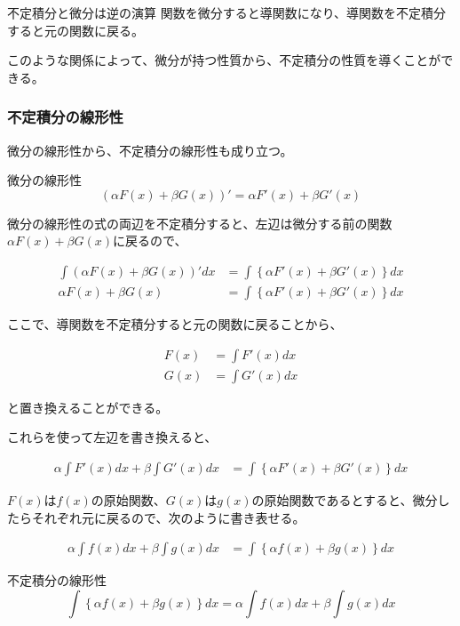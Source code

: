 \documentclass[../../imaging-math]{subfiles}
\begin{document}
\begin{theorem}{不定積分と微分は逆の演算}
  \titlegap
  関数を微分すると導関数になり、導関数を不定積分すると元の関数に戻る。
\end{theorem}

このような関係によって、微分が持つ性質から、不定積分の性質を導くことができる。

\subsubsection{不定積分の線形性}

微分の線形性から、不定積分の線形性も成り立つ。

\begin{review}
  微分の線形性
  \begin{equation}
    (\alpha F(x) + \beta G(x))' = \alpha F'(x) + \beta G'(x)
  \end{equation}
\end{review}

微分の線形性の式の両辺を不定積分すると、左辺は微分する前の関数$\alpha F(x) + \beta G(x)$に戻るので、

\begin{align}
  \int (\alpha F(x) + \beta G(x))' dx & = \int \left\{ \alpha F'(x) + \beta G'(x) \right\} dx \\
  \alpha F(x) + \beta G(x)            & = \int \left\{ \alpha F'(x) + \beta G'(x) \right\} dx
\end{align}

ここで、導関数を不定積分すると元の関数に戻ることから、

\begin{align}
  F(x) & = \int F'(x) dx \\
  G(x) & = \int G'(x) dx
\end{align}

と置き換えることができる。

これらを使って左辺を書き換えると、

\begin{align}
  \alpha \int F'(x) dx + \beta \int G'(x) dx & = \int \left\{ \alpha F'(x) + \beta G'(x) \right\} dx
\end{align}

$F(x)$は$f(x)$の原始関数、$G(x)$は$g(x)$の原始関数であるとすると、微分したらそれぞれ元に戻るので、次のように書き表せる。

\begin{align}
  \alpha \int f(x) dx + \beta \int g(x) dx & = \int \left\{ \alpha f(x) + \beta g(x) \right\} dx
\end{align}

\begin{theorem}{不定積分の線形性}
  \Large
  \begin{equation}
    \int \left\{ \alpha f(x) + \beta g(x) \right\} dx = \alpha \int f(x) dx + \beta \int g(x) dx
  \end{equation}
\end{theorem}
\end{document}
